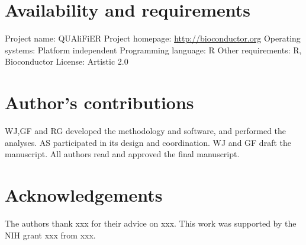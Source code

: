 \documentclass[10pt]{bmc_article}
\newenvironment{bmcformat}{\baselineskip20pt\sloppy\setboolean{publ}{false}}{\baselineskip20pt\sloppy}
\begin{document}
\begin{bmcformat}
  
\section*{Availability and requirements}
Project name: QUAliFiER\pb
Project homepage: \url{http://bioconductor.org}\pb
Operating systems: Platform independent\pb
Programming language: R\pb
Other requirements: R, Bioconductor\pb
License: Artistic 2.0\pb

\bigskip

\section*{Author's contributions}
    WJ,GF and RG developed the methodology and software, and performed the
    analyses. AS participated in its design and coordination.  WJ and GF draft
    the manuscript.  All authors read and approved the final manuscript.

    

\section*{Acknowledgements}
  The authors thank  xxx for their advice on xxx. This work was supported by the
  NIH grant xxx from xxx.
 

\newpage
{
   }     %


\end{bmcformat}
\end{document}
